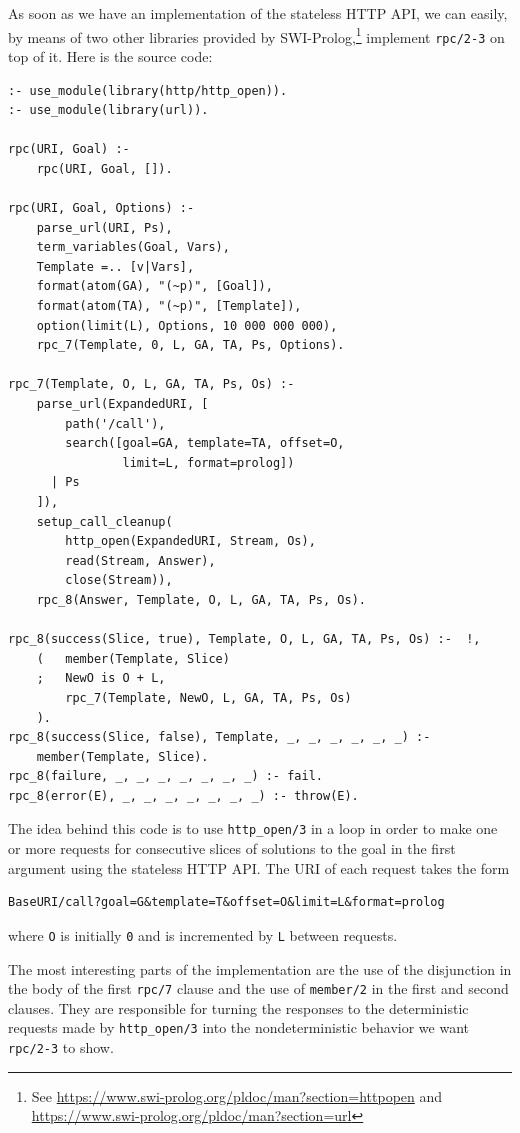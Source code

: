 As soon as we have an implementation of the stateless
HTTP API, we can easily, by means of two other libraries provided by SWI-Prolog,\footnote{See \url{https://www.swi-prolog.org/pldoc/man?section=httpopen} and\\ \url{https://www.swi-prolog.org/pldoc/man?section=url}} implement \texttt{rpc/2-3} on top of it. Here is the source code:

\begin{verbatim}
:- use_module(library(http/http_open)).
:- use_module(library(url)).

rpc(URI, Goal) :-
    rpc(URI, Goal, []).

rpc(URI, Goal, Options) :-
    parse_url(URI, Ps),
    term_variables(Goal, Vars),
    Template =.. [v|Vars],
    format(atom(GA), "(~p)", [Goal]),
    format(atom(TA), "(~p)", [Template]),
    option(limit(L), Options, 10 000 000 000),
    rpc_7(Template, 0, L, GA, TA, Ps, Options).

rpc_7(Template, O, L, GA, TA, Ps, Os) :-    
    parse_url(ExpandedURI, [
        path('/call'),
        search([goal=GA, template=TA, offset=O,
                limit=L, format=prolog])
      | Ps
    ]),
    setup_call_cleanup(
        http_open(ExpandedURI, Stream, Os),
        read(Stream, Answer),
        close(Stream)),
    rpc_8(Answer, Template, O, L, GA, TA, Ps, Os).

rpc_8(success(Slice, true), Template, O, L, GA, TA, Ps, Os) :-  !,
    (   member(Template, Slice)
    ;   NewO is O + L,
        rpc_7(Template, NewO, L, GA, TA, Ps, Os)
    ).
rpc_8(success(Slice, false), Template, _, _, _, _, _, _) :-
    member(Template, Slice).
rpc_8(failure, _, _, _, _, _, _, _) :- fail.
rpc_8(error(E), _, _, _, _, _, _, _) :- throw(E).
\end{verbatim}

\noindent The idea behind this code is to use \texttt{http\_open/3} in a loop in order to make one or more requests for consecutive slices of solutions to the goal in the first argument using the stateless HTTP API. The URI of each request takes the form

\begin{verbatim}
BaseURI/call?goal=G&template=T&offset=O&limit=L&format=prolog
\end{verbatim}

\noindent where \texttt{O} is initially \texttt{0} and is incremented by
\texttt{L} between requests.

The most interesting parts of the implementation are the use of the disjunction in the body of the first \texttt{rpc/7} clause and the use of \texttt{member/2} in the first and second clauses. They are responsible for turning the responses to the deterministic requests made by \texttt{http\_open/3} into the nondeterministic behavior we want \texttt{rpc/2-3} to show. 

